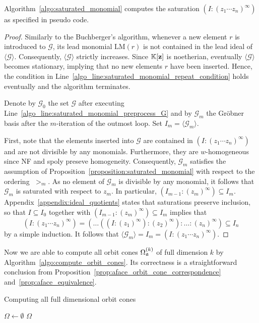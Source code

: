 \begin{prop}
	Algorithm~\ref{algo:saturated_monomial} computes the saturation $(I:(z_1\cdots z_n)^\infty)$ as specified in pseudo code.
\end{prop}
\begin{proof}
	Similarly to the Buchberger's algorithm, whenever a new element $r$ is introduced to $\mathcal{G}$, its lead monomial $\text{LM}(r)$ is not contained in the lead ideal of $\langle \mathcal{G} \rangle$. Consequently, $\langle \mathcal{G} \rangle$ strictly increases. Since $\mathbb{K}[\mathbf{z}]$ is noetherian, eventually $\langle \mathcal{G} \rangle$ becomes stationary, implying that no new elements $r$ have been inserted. Hence, the condition in Line~\ref{algo_line:saturated_monomial_repeat_condition} holds eventually and the algorithm terminates.
	
	Denote by $\mathcal{G}_0$ the set $\mathcal{G}$ after executing Line~\ref{algo_line:saturated_monomial_preprocess_G} and by $\mathcal{G}_m$ the Gröbner basis after the $m$-iteration of the outmost loop. Set $I_m = \langle \mathcal{G}_m \rangle$.
	
	First, note that the elements inserted into $\mathcal{G}$ are contained in $(I:(z_1\cdots z_n)^\infty)$ and are not divisible by any monomials. Furthermore, they are $w$-homogeneous since NF and spoly preseve homogeneity. Consequently, $\mathcal{G}_m$ satisfies the assumption of Proposition~\ref{proposition:saturated_monomial} with respect to the ordering $\;>_m$. As no element of $\mathcal{G}_m$ is divisible by any monomial, it follows that $\mathcal{G}_m$ is saturated with respect to $z_m$. In particular, $(I_{m-1} : (z_m)^\infty) \subseteq I_m$. Appendix~\ref{appendix:ideal_quotients} states that saturations preserve inclusion, so that $I\subseteq I_0$ together with $(I_{m-1} : (z_m)^\infty) \subseteq I_m$ implies that
	$$(I:(z_1\cdots z_n)^\infty) = (\dots((I:(z_1)^\infty):(z_2)^\infty):\dots : (z_n)^\infty) \subseteq I_n$$
	by a simple induction. It follows that $\langle \mathcal{G}_m \rangle = I_m = (I:(z_1\cdots z_n)^\infty)$.
\end{proof}

Now we are able to compute all orbit cones $\Omega_{\mathfrak{a}}^{(k)}$ of full dimension $k$ by Algorithm~\ref{algo:compute_orbit_cones}. Its correctness is a straightforward conclusion from  Proposition~\ref{prop:aface_orbit_cone_correspondence} and~\ref{prop:aface_equivalence}.

\begin{algorithm}
	\caption{Computing all full dimensional orbit cones}
	\label{algo:compute_orbit_cones}
	
	\BlankLine
	$\Omega \leftarrow \emptyset$\;
	\Return $\Omega$\;
\end{algorithm}

